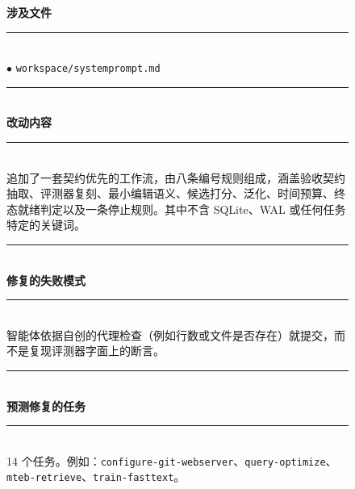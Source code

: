 \begin{figure}[t]
    \centering
    \scriptsize
    \begin{tcbraster}[raster columns=2,
                      raster equal height,
                      raster column skip=4pt,
                      raster row skip=0pt,
                      raster left skip=0pt,
                      raster right skip=0pt,
                      boxrule=0.6pt,
                      left=4pt,right=4pt,top=3pt,bottom=3pt,
                      coltitle=white]
        \begin{tcolorbox}[colback=aheSky!18,colframe=aheNavy,colbacktitle=aheNavy,
                          title={\scriptsize\textbf{chg-1，迭代 1，commit \texttt{c0b8a05}，层级：提示词}}]
            \textbf{\textcolor{aheNavy}{涉及文件}} \\
            \rule{\linewidth}{0.3pt}\\[1pt]
            $\bullet$ \texttt{workspace/systemprompt.md} \\[3pt]
            \rule{\linewidth}{0.3pt}\\
            \textbf{\textcolor{aheNavy}{改动内容}} \\
            \rule{\linewidth}{0.3pt}\\[1pt]
            追加了一套契约优先的工作流，由八条编号规则组成，涵盖验收契约抽取、评测器复刻、最小编辑语义、候选打分、泛化、时间预算、终态就绪判定以及一条停止规则。其中不含 SQLite、WAL 或任何任务特定的关键词。 \\[3pt]
            \rule{\linewidth}{0.3pt}\\
            \textbf{\textcolor{aheNavy}{修复的失败模式}} \\
            \rule{\linewidth}{0.3pt}\\[1pt]
            智能体依据自创的代理检查（例如行数或文件是否存在）就提交，而不是复现评测器字面上的断言。 \\[3pt]
            \rule{\linewidth}{0.3pt}\\
            \textbf{\textcolor{aheNavy}{预测修复的任务}} \\
            \rule{\linewidth}{0.3pt}\\[1pt]
            14 个任务。例如：\texttt{configure-git-webserver}、\texttt{query-optimize}、\texttt{mteb-retrieve}、\texttt{train-fasttext}。

\end{tcolorbox}
\end{tcbraster}
\end{figure}
